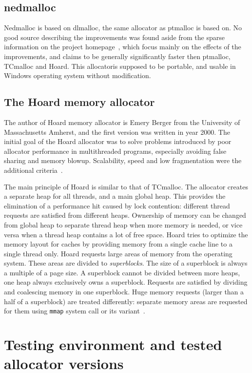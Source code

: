 \subsection{nedmalloc}

Nedmalloc is based on dlmalloc, the same allocator as ptmalloc is based on. No good source describing the improvements was found aside from the sparse information on the project homepage~\cite{allocators:nedmalloc}, which focus mainly on the effects of the improvements, and claims to be generally significantly faster then ptmalloc, TCmalloc and Hoard. This allocatoris supposed to be portable, and usable in Windows operating system without modification.

\subsection{The Hoard memory allocator}
The author of Hoard memory allocator is Emery Berger from the University of
Massachusetts Amherst, and the first version was written in year 2000. The initial goal of the
Hoard allocator was to solve problems introduced by poor allocator performance
in multithreaded programs, especially avoiding false sharing and memory blowup.
Scalability, speed and low fragmentation were the additional
criteria~\cite{allocators:hoard}.

The main principle of Hoard is similar to that of TCmalloc. The allocator
creates a separate heap for all threads, and a main global heap. This provides
the elimination of a performance hit caused by lock contention: different thread
requests are satisfied from different heaps. Ownership of memory can be changed
from global heap to separate thread heap when more memory is needed, or vice
versa when a thread heap contains a lot of free space. Hoard tries to optimize
the memory layout for caches by providing memory from a single cache line to a
single thread only. Hoard requests large areas of memory from the operating
system. These areas are divided to {\em superblocks}. The size of a superblock
is always a multiple of a page size. A superblock cannot be divided between more
heaps, one heap always exclusively owns a superblock. Requests are satisfied by
dividing and coalescing memory in one superblock. Huge memory requests (larger
than a half of a superblock) are treated differently: separate memory areas are
requested for them using {\tt mmap} system call or its variant~\cite{allocators:hoard}.

\section{Testing environment and tested allocator versions}

